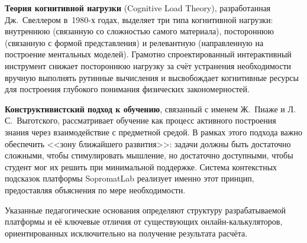 \textbf{Теория когнитивной нагрузки} (Cognitive Load Theory), разработанная Дж.~Свеллером в~1980-х годах, выделяет три типа когнитивной нагрузки: внутреннюю (связанную со сложностью самого материала), постороннюю (связанную с формой представления) и релевантную (направленную на построение ментальных моделей). Грамотно спроектированный интерактивный инструмент снижает постороннюю нагрузку за счёт устранения необходимости вручную выполнять рутинные вычисления и высвобождает когнитивные ресурсы для построения глубокого понимания физических закономерностей.

\textbf{Конструктивистский подход к обучению}, связанный с именем Ж.~Пиаже и Л.\,С.~Выготского, рассматривает обучение как процесс активного построения знания через взаимодействие с предметной средой. В рамках этого подхода важно обеспечить <<зону ближайшего развития>>: задачи должны быть достаточно сложными, чтобы стимулировать мышление, но достаточно доступными, чтобы студент мог их решить при минимальной поддержке. Система контекстных подсказок платформы SopromatLab реализует именно этот принцип, предоставляя объяснения по мере необходимости.

Указанные педагогические основания определяют структуру разрабатываемой платформы и её ключевые отличия от существующих онлайн-калькуляторов, ориентированных исключительно на получение результата расчёта.
